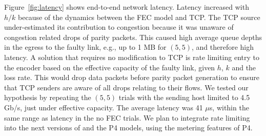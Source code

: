 Figure~\ref{fig:latency} shows end-to-end network latency. Latency increased
with $h/k$ because of the dynamics between the FEC model and TCP. The TCP
source under-estimated its contribution to congestion because it was unaware
of congestion related drops of parity packets. This caused high average queue
depths in the egress to the faulty link, e.g., up to 1 MB for $(5,5)$, and
therefore high latency. A solution that requires no modification to TCP is
rate limiting entry to the encoder based on the effective capacity of the
faulty link, given $h$, $k$ and the loss rate. This would drop data packets
before parity packet generation to ensure that TCP senders are aware of  all
drops relating to their flows. We tested our hypothesis by repeating the $(5,
5)$ trials with the sending host limited to 4.5 Gb/s, just under effective
capacity. The average latency was 41 $\mu$s, within the same range as latency
in the no FEC trials. We plan to integrate rate limiting into the next
versions of \OurSys and the P4 models, using the metering features of P4.


